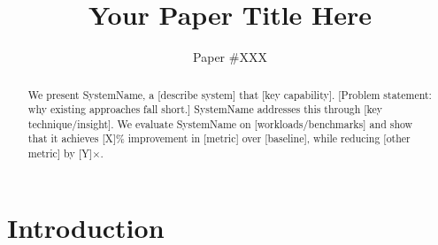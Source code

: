 \documentclass[letterpaper,twocolumn,10pt]{article}
\newcommand{\system}{SystemName\xspace}
\begin{document}
\title{Your Paper Title Here}

\author{Paper \#XXX}  %

\maketitle

\begin{abstract}
%

We present \system, a [describe system] that [key capability].
[Problem statement: why existing approaches fall short.]
\system addresses this through [key technique/insight].
We evaluate \system on [workloads/benchmarks] and show that it achieves
[X]\% improvement in [metric] over [baseline], while reducing [other metric]
by [Y]$\times$.
\end{abstract}

\section{Introduction}
\label{sec:intro}

%
\end{document}
